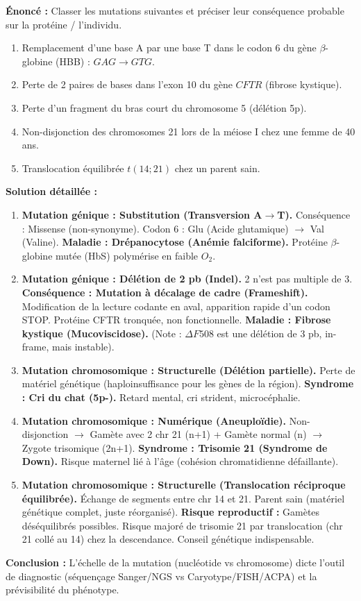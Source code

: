 \documentclass[11pt]{article}
\begin{document}
\begin{exoresolu}
    \textbf{Énoncé :} Classer les mutations suivantes et préciser leur conséquence probable sur la protéine / l'individu.
    \begin{enumerate}
        \item Remplacement d'une base A par une base T dans le codon 6 du gène $\beta$-globine (HBB) : $GAG \to GTG$.
        \item Perte de 2 paires de bases dans l'exon 10 du gène $CFTR$ (fibrose kystique).
        \item Perte d'un fragment du bras court du chromosome 5 (délétion 5p).
        \item Non-disjonction des chromosomes 21 lors de la méiose I chez une femme de 40 ans.
        \item Translocation équilibrée $t(14;21)$ chez un parent sain.
    \end{enumerate}
    \tcblower
    \textbf{Solution détaillée :}
    \begin{enumerate}
        \item \textbf{Mutation génique : Substitution (Transversion A$\to$T).} Conséquence : Missense (non-synonyme). Codon 6 : Glu (Acide glutamique) $\to$ Val (Valine). \textbf{Maladie : Drépanocytose (Anémie falciforme).} Protéine $\beta$-globine mutée (HbS) polymérise en faible $O_2$.
        \item \textbf{Mutation génique : Délétion de 2 pb (Indel).} 2 n'est pas multiple de 3. \textbf{Conséquence : Mutation à décalage de cadre (Frameshift).} Modification de la lecture codante en aval, apparition rapide d'un codon STOP. Protéine CFTR tronquée, non fonctionnelle. \textbf{Maladie : Fibrose kystique (Mucoviscidose).} (Note : $\Delta F508$ est une délétion de 3 pb, in-frame, mais instable).
        \item \textbf{Mutation chromosomique : Structurelle (Délétion partielle).} Perte de matériel génétique (haploinsuffisance pour les gènes de la région). \textbf{Syndrome : Cri du chat (5p-).} Retard mental, cri strident, microcéphalie.
        \item \textbf{Mutation chromosomique : Numérique (Aneuploïdie).} Non-disjonction $\to$ Gamète avec 2 chr 21 (n+1) + Gamète normal (n) $\to$ Zygote trisomique (2n+1). \textbf{Syndrome : Trisomie 21 (Syndrome de Down).} Risque maternel lié à l'âge (cohésion chromatidienne défaillante).
        \item \textbf{Mutation chromosomique : Structurelle (Translocation réciproque équilibrée).} Échange de segments entre chr 14 et 21. Parent sain (matériel génétique complet, juste réorganisé). \textbf{Risque reproductif :} Gamètes déséquilibrés possibles. Risque majoré de trisomie 21 par translocation (chr 21 collé au 14) chez la descendance. Conseil génétique indispensable.
    \end{enumerate}
    \textbf{Conclusion :} L'échelle de la mutation (nucléotide vs chromosome) dicte l'outil de diagnostic (séquençage Sanger/NGS vs Caryotype/FISH/ACPA) et la prévisibilité du phénotype.
\end{exoresolu}
\end{document}
